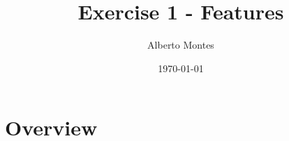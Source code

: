 \documentclass{ethz_report}
\title{Exercise 1 - Features}
\author{Alberto Montes}
\date{\today}
\begin{document}
\maketitle

\section{Overview}
\blindtext
\end{document}
